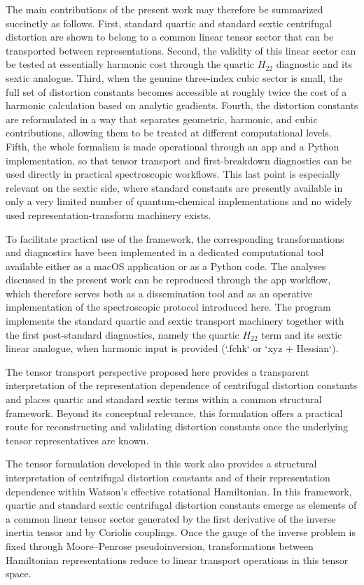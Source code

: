 The main contributions of the present work may therefore be summarized
succinctly as follows. First, standard quartic and standard sextic
centrifugal distortion are shown to belong to a common linear tensor
sector that can be transported between representations. Second, the
validity of this linear sector can be tested at essentially harmonic
cost through the quartic $H_{22}$ diagnostic and its sextic analogue.
Third, when the genuine three-index cubic sector is small, the full set
of distortion constants becomes accessible at roughly twice the cost of
a harmonic calculation based on analytic gradients. Fourth, the
distortion constants are reformulated in a way that separates geometric,
harmonic, and cubic contributions, allowing them to be treated at
different computational levels. Fifth, the whole formalism is made
operational through an app and a Python implementation, so that tensor
transport and first-breakdown diagnostics can be used directly in
practical spectroscopic workflows. This last point is especially
relevant on the sextic side, where standard constants are presently
available in only a very limited number of quantum-chemical
implementations and no widely used representation-transform machinery
exists.

To facilitate practical use of the framework, the corresponding
transformations and diagnostics have been implemented in a dedicated
computational tool available either as a macOS application or as a
Python code. The analyses discussed in the present work can be
reproduced through the app workflow, which therefore serves both as a
dissemination tool and as an operative implementation of the
spectroscopic protocol introduced here. The program implements the
standard quartic and sextic transport machinery together with the first
post-standard diagnostics, namely the quartic $H_{22}$ term and its
sextic linear analogue, when harmonic input is provided (`.fchk` or
`xyz + Hessian`).

The tensor transport perspective proposed here provides a transparent
interpretation of the representation dependence of centrifugal
distortion constants and places quartic and standard sextic terms
within a common structural framework. Beyond its conceptual relevance,
this formulation offers a practical route for reconstructing and
validating distortion constants once the underlying tensor
representatives are known.

The tensor formulation developed in this work also provides a
structural interpretation of centrifugal distortion constants and of
their representation dependence within Watson's effective rotational
Hamiltonian. In this framework, quartic and standard sextic
centrifugal distortion constants emerge as elements of a common linear
tensor sector generated by the first derivative of the inverse inertia
tensor and by Coriolis couplings. Once the gauge of the inverse
problem is fixed through Moore--Penrose pseudoinversion,
transformations between Hamiltonian representations reduce to linear
transport operations in this tensor space.

